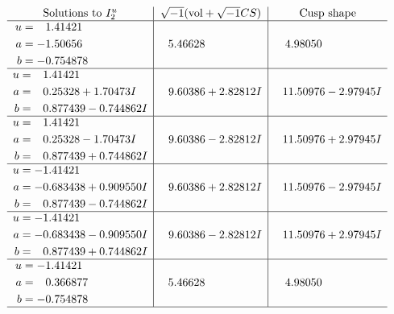 \documentclass[1p]{elsarticle_modified}
\theoremstyle{definition}
\newcommand{\I}{\sqrt{-1}}
\begin{document}
$$\begin{array}{c|c|c}  
\text{Solutions to }I^u_{2}& \I (\text{vol} + \sqrt{-1}CS) & \text{Cusp shape}\\
 \hline 
\begin{aligned}
u &= \phantom{-}1.41421\phantom{ +0.000000I} \\
a &= -1.50656\phantom{ +0.000000I} \\
b &= -0.754878\phantom{ +0.000000I}\end{aligned}
 & \phantom{-}5.46628\phantom{ +0.000000I} & \phantom{-}4.98050\phantom{ +0.000000I} \\ \hline\begin{aligned}
u &= \phantom{-}1.41421\phantom{ +0.000000I} \\
a &= \phantom{-}0.25328 + 1.70473 I \\
b &= \phantom{-}0.877439 - 0.744862 I\end{aligned}
 & \phantom{-}9.60386 + 2.82812 I & \phantom{-}11.50976 - 2.97945 I \\ \hline\begin{aligned}
u &= \phantom{-}1.41421\phantom{ +0.000000I} \\
a &= \phantom{-}0.25328 - 1.70473 I \\
b &= \phantom{-}0.877439 + 0.744862 I\end{aligned}
 & \phantom{-}9.60386 - 2.82812 I & \phantom{-}11.50976 + 2.97945 I \\ \hline\begin{aligned}
u &= -1.41421\phantom{ +0.000000I} \\
a &= -0.683438 + 0.909550 I \\
b &= \phantom{-}0.877439 - 0.744862 I\end{aligned}
 & \phantom{-}9.60386 + 2.82812 I & \phantom{-}11.50976 - 2.97945 I \\ \hline\begin{aligned}
u &= -1.41421\phantom{ +0.000000I} \\
a &= -0.683438 - 0.909550 I \\
b &= \phantom{-}0.877439 + 0.744862 I\end{aligned}
 & \phantom{-}9.60386 - 2.82812 I & \phantom{-}11.50976 + 2.97945 I \\ \hline\begin{aligned}
u &= -1.41421\phantom{ +0.000000I} \\
a &= \phantom{-}0.366877\phantom{ +0.000000I} \\
b &= -0.754878\phantom{ +0.000000I}\end{aligned}
 & \phantom{-}5.46628\phantom{ +0.000000I} & \phantom{-}4.98050\phantom{ +0.000000I}\\
 \hline 
 \end{array}$$\newpage\newpage\renewcommand{\arraystretch}{1}
\end{document}
